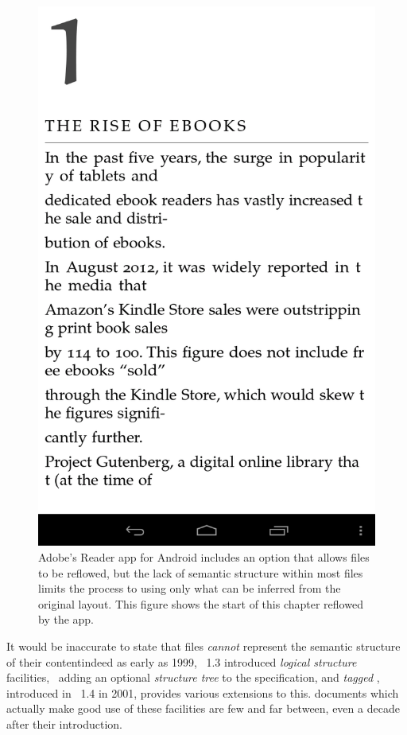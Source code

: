 \begin{figure}
\includegraphics[width=\textwidth]{gfx/acrobatreflow}
\caption[Reflowed text of a \textsc{pdf} file]{Adobe's Reader app for Android includes an option that allows \pdf{} files to be reflowed, but the lack of semantic structure within most \pdf{} files limits the process to using only what can be inferred from the original layout. This figure shows the start of this chapter reflowed by the app.}
\label{fig:acrobatreflow}
\end{figure}

It would be inaccurate to state that \pdf{} files \emph{cannot} represent the semantic structure of their content\ed indeed as early as 1999, \pdf{}~1.3 introduced \emph{logical structure} facilities,~\cite{Adobe2001} adding an optional \emph{structure tree} to the \pdf{} specification, and \emph{tagged \pdf{}}, introduced in \pdf{}~1.4 in 2001, provides various extensions to this. \pdf{} documents which actually make good use of these facilities are few and far between, even a decade after their introduction.

